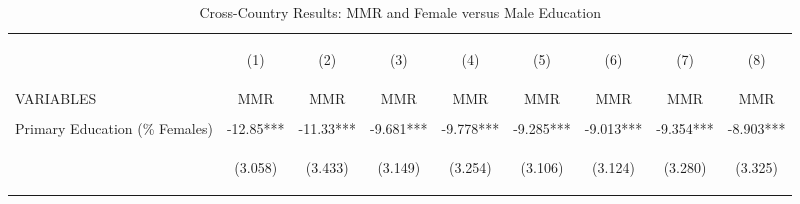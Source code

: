 \begin{landscape}\begin{table}[htpb!]\begin{center}\caption{Cross-Country Results: MMR and Female versus Male Education}\label{MMRtab:MMRgender}\begin{tabular}{lcccccccc}\toprule&\begin{footnotesize}(1)\end{footnotesize}&\begin{footnotesize}(2)\end{footnotesize}&\begin{footnotesize}(3)\end{footnotesize}&\begin{footnotesize}(4)\end{footnotesize}&\begin{footnotesize}(5)\end{footnotesize}&\begin{footnotesize}(6)\end{footnotesize}&\begin{footnotesize}(7)\end{footnotesize}&\begin{footnotesize}(8) \end{footnotesize}\\
VARIABLES&MMR&MMR&MMR&MMR&MMR&MMR&MMR&MMR\\ \midrule
&&&&&&&&\\
Primary Education (\% Females) &-12.85***&-11.33***&-9.681***&-9.778***&-9.285***&-9.013***&-9.354***&-8.903***\\
&\begin{footnotesize}(3.058)\end{footnotesize}&\begin{footnotesize}(3.433)\end{footnotesize}&\begin{footnotesize}(3.149)\end{footnotesize}&\begin{footnotesize}(3.254)\end{footnotesize}&\begin{footnotesize}(3.106)\end{footnotesize}&\begin{footnotesize}(3.124)\end{footnotesize}&\begin{footnotesize}(3.280)\end{footnotesize}&\begin{footnotesize}(3.325)\end{footnotesize}\\

\end{tabular}
\end{center}
\end{table}
\end{landscape}

